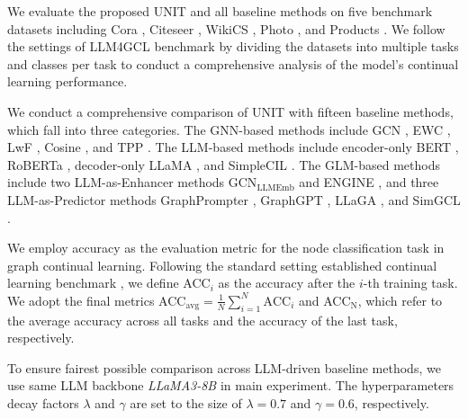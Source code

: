 \documentclass[sigconf]{acmart}
\begin{document}
We evaluate the proposed UNIT and all baseline methods on five benchmark datasets including Cora \cite{Cora}, Citeseer \cite{Citeseer}, WikiCS \cite{WikiCS}, Photo \cite{Photo}, and Products \cite{Products}.
We follow the settings of LLM4GCL benchmark \cite{SimGCL} by dividing the datasets into multiple tasks and classes per task to conduct a comprehensive analysis of the model's continual learning performance.

We conduct a comprehensive comparison of UNIT with fifteen baseline methods, which fall into three categories.
The GNN-based methods include GCN \cite{GCN}, EWC \cite{EWC}, LwF \cite{LwF}, Cosine \cite{Cosine}, and TPP \cite{TPP}.
The LLM-based methods include encoder-only BERT \cite{BERT}, RoBERTa \cite{Roberta}, decoder-only LLaMA \cite{llama}, and SimpleCIL \cite{SimpleCIL}.
The GLM-based methods include two LLM-as-Enhancer methods GCN$_{\text{LLMEmb}}$ \cite{GCN_emb} and ENGINE \cite{ENGINE}, and three LLM-as-Predictor methods GraphPrompter \cite{GraphPrompter}, GraphGPT \cite{Graphgpt}, LLaGA \cite{Llaga}, and SimGCL \cite{SimGCL}.

We employ accuracy as the evaluation metric for the node classification task in graph continual learning.
Following the standard setting established continual learning benchmark \cite{GCL_bench}, we define ACC$_{i}$ as the accuracy after the $i$-th training task.
We adopt the final metrics ACC$_{\text{avg}}=\frac{1}{N} {\textstyle \sum_{i=1}^{N}} \text{ACC}_{i}$ and ACC$_\text{N}$, which refer to the average accuracy across all tasks and the accuracy of the last task, respectively.

To ensure fairest possible comparison across LLM-driven baseline methods, we use same LLM backbone \emph{LLaMA3-8B} in main experiment.
The hyperparameters decay factors $\lambda$ and $\gamma$ are set to the size of $\lambda=0.7$ and $\gamma=0.6$, respectively.
\end{document}
